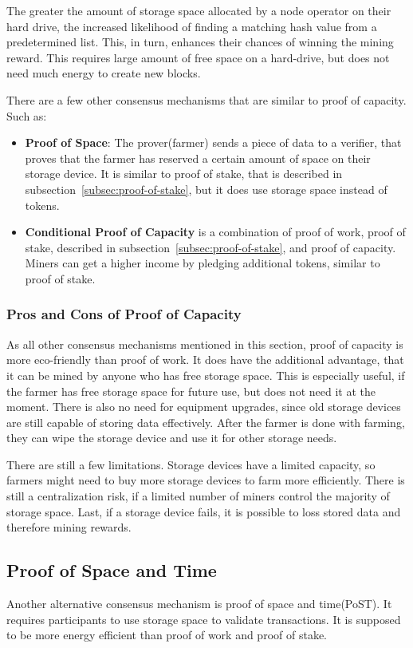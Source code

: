The greater the amount of storage space allocated by a node operator on their hard drive, the increased likelihood of finding a matching hash value from a predetermined list.
This, in turn, enhances their chances of winning the mining reward.
This requires large amount of free space on a hard-drive, but does not need much energy to create new blocks.\cite{chia-whitepaper,geeksforgeeks-poc}

There are a few other consensus mechanisms that are similar to proof of capacity.
Such as:
\begin{itemize}
    \item\textbf{Proof of Space}: The prover(farmer) sends a piece of data to a verifier, that proves that the farmer has reserved a certain amount of space on their storage device.
    It is similar to proof of stake, that is described in subsection\ \ref{subsec:proof-of-stake}, but it does use storage space instead of tokens.
    \item\textbf{Conditional Proof of Capacity} is a combination of proof of work, proof of stake, described in subsection\ \ref{subsec:proof-of-stake}, and proof of capacity.
    Miners can get a higher income by pledging additional tokens, similar to proof of stake.
\end{itemize}

\subsubsection{Pros and Cons of Proof of Capacity}
As all other consensus mechanisms mentioned in this section, proof of capacity is more eco-friendly than proof of work.
It does have the additional advantage, that it can be mined by anyone who has free storage space.
This is especially useful, if the farmer has free storage space for future use, but does not need it at the moment.
There is also no need for equipment upgrades, since old storage devices are still capable of storing data effectively.
After the farmer is done with farming, they can wipe the storage device and use it for other storage needs.

There are still a few limitations.
Storage devices have a limited capacity, so farmers might need to buy more storage devices to farm more efficiently.
There is still a centralization risk, if a limited number of miners control the majority of storage space.
Last, if a storage device fails, it is possible to loss stored data and therefore mining rewards.\cite{geeksforgeeks-poc}


\subsection{Proof of Space and Time}\label{subsec:proof-of-space-and-time}
Another alternative consensus mechanism is proof of space and time(PoST).
It requires participants to use storage space to validate transactions.
It is supposed to be more energy efficient than proof of work and proof of stake.

